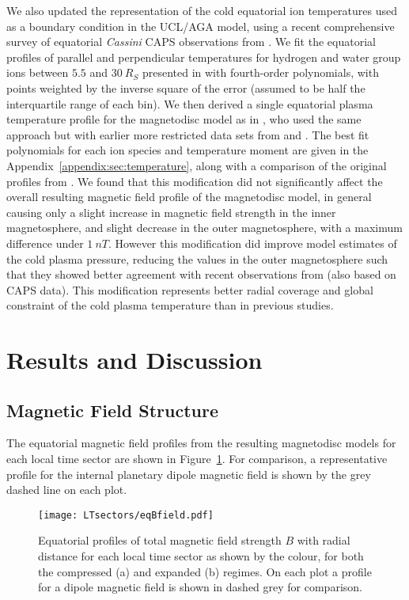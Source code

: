 We also updated the representation of the cold equatorial ion temperatures used as a boundary condition in the UCL/AGA model, using a recent comprehensive survey of equatorial \textit{Cassini} CAPS observations from \citet{wilson2017}. We fit the equatorial profiles of parallel and perpendicular temperatures for hydrogen and water group ions between $5.5$ and $\SI{30}{R_S}$ presented in \citet{wilson2017} with fourth-order polynomials, with points weighted by the inverse square of the error (assumed to be half the interquartile range of each bin). We then derived a single equatorial plasma temperature profile for the magnetodisc model as in \citet{achilleos2010b}, who used the same approach but with earlier more restricted data sets from \citet{wilson2008} and \citet{mcandrews2009}. The best fit polynomials for each ion species and temperature moment are given in the Appendix~\ref{appendix:sec:temperature}, along with a comparison of the original profiles from \citet{achilleos2010b}. We found that this modification did not significantly affect the overall resulting magnetic field profile of the magnetodisc model, in general causing only a slight increase in magnetic field strength in the inner magnetosphere, and slight decrease in the outer magnetosphere, with a maximum difference under $\SI{1}{nT}$. However this modification did improve model estimates of the cold plasma pressure, reducing the values in the outer magnetosphere such that they showed better agreement with recent observations from \citet{sergis2017} (also based on CAPS data). This modification represents better radial coverage and global constraint of the cold plasma temperature than in previous studies.

\section{Results and Discussion}\label{LTsectors:sec:results}
\subsection{Magnetic Field Structure}
The equatorial magnetic field profiles from the resulting magnetodisc models for each local time sector are shown in Figure~\ref{LTsectors:fig:eqBfield}. For comparison, a representative profile for the internal planetary dipole magnetic field is shown by the grey dashed line on each plot.

\begin{figure}
\centering
\texttt{[image: LTsectors/eqBfield.pdf]}
\caption[Model equatorial profiles of magnetic field strength $B$ for different local time sectors, for compressed and expanded regimes.]{Equatorial profiles of total magnetic field strength $B$ with radial distance for each local time sector as shown by the colour, for both the compressed (a) and expanded (b) regimes. On each plot a profile for a dipole magnetic field is shown in dashed grey for comparison.}
\label{LTsectors:fig:eqBfield}
\end{figure}

